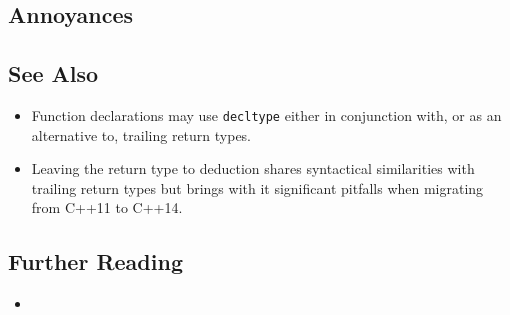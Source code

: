 \hspace{\fill}

\subsection[Annoyances]{Annoyances}\label{annoyances}

\hspace{\fill}

\subsection[See Also]{See Also}\label{see-also}

\begin{itemize}
\item{%
Function declarations may use \lstinline!decltype! either in conjunction with, or as an alternative to, trailing return types.}
\item{%
Leaving the return type to deduction shares syntactical similarities with trailing return types but brings with it significant pitfalls when migrating from C++11 to C++14.}
\end{itemize}

\subsection[Further Reading]{Further Reading}\label{further-reading}

\begin{itemize}
\item{\cite{mertz18}}
\end{itemize}


